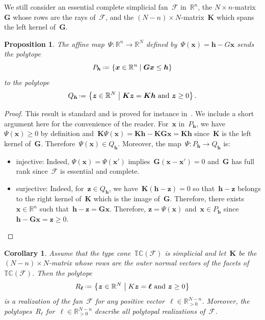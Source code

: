 \documentclass{amsart}
\newtheorem{corollary}[theorem]{Corollary}
\newtheorem{proposition}[theorem]{Proposition}
\theoremstyle{definition}
\newcommand{\R}{\mathbb{R}} %
\renewcommand{\b}[1]{{\boldsymbol{#1}}} %
\newcommand{\set}[2]{\left\{ #1 \;\middle|\; #2 \right\}} %
\newcommand{\eqdef}{\mbox{\,\raisebox{0.2ex}{\scriptsize\ensuremath{\mathrm:}}\ensuremath{=}\,}} %
\newcommand{\Fan}{\mathcal{F}} %
\newcommand{\typeCone}{\mathbb{TC}} %
\begin{document}
We still consider an essential complete simplicial fan~$\Fan$ in~$\R^n$, the $N \times n$-matrix~$\b{G}$ whose rows are the rays of~$\Fan$, and the $(N-n) \times N$-matrix~$\b{K}$ which spans the left kernel of~$\b{G}$.

\begin{proposition}
\label{prop:alternativePolytopalRealization}
The affine map~$\Psi: \R^n \to \R^N$ defined by~$\Psi(\b{x}) = \b{h} - G\b{x}$ sends the polytope
\[
P_\b{h} \eqdef \set{\b{x} \in \R^n}{\b{G}\b{x} \le \b{h}}
\]
to the polytope
\[
Q_\b{h} \eqdef \set{\b{z} \in \R^N}{\b{K}\b{z} = \b{K}\b{h} \text{ and } \b{z} \ge 0}.
\]
\end{proposition}

\begin{proof}
This result is standard and is proved for instance in~\cite[Coro.~9.5.7]{DeLoeraRambauSantos}.
We include a short argument here for the convenience of the reader.
For~$\b{x}$ in~$P_\b{h}$, we have $\Psi(\b{x}) \ge 0$ by definition and~$\b{K}\Psi(\b{x}) = \b{K}\b{h} - \b{K}\b{G}\b{x} = \b{K}\b{h}$ since~$\b{K}$ is the left kernel of~$\b{G}$. Therefore~$\Psi(\b{x}) \in Q_\b{h}$.
Moreover, the map~$\Psi : P_\b{h} \to Q_\b{h}$ is:
\begin{itemize}
\item injective: Indeed, $\Psi(\b{x}) = \Psi(\b{x}')$ implies~$\b{G}(\b{x} - \b{x}') = 0$ and~$\b{G}$ has full rank since~$\Fan$ is essential and complete.
\item surjective: Indeed, for~$\b{z} \in Q_\b{h}$, we have~$\b{K}(\b{h}-\b{z}) = 0$ so that~$\b{h}-\b{z}$ belongs to the right kernel of~$\b{K}$ which is the image of~$\b{G}$. Therefore, there exists~$\b{x} \in \R^n$ such that~$\b{h}-\b{z} = \b{G}\b{x}$. Therefore, $\b{z} = \Psi(\b{x})$ and~$\b{x} \in P_\b{h}$ since~$\b{h} - \b{G}\b{x} = \b{z} \ge 0$.\qedhere
\end{itemize}
\end{proof}

\begin{corollary}
\label{coro:simplicialTypeCone}
Assume that the type cone~$\typeCone(\Fan)$ is simplicial and let~$\b{K}$ be the $(N-n) \times N$-matrix whose rows are the outer normal vectors of the facets of~$\typeCone(\Fan)$. Then the polytope
\[
R_\b{\ell} \eqdef \set{\b{z} \in \R^N}{K\b{z} = \b{\ell} \text{ and } \b{z} \ge 0}
\]
is a realization of the fan~$\Fan$ for any positive vector~$\b{\ell} \in \R_{>0}^{N-n}$.
Moreover, the polytopes~$R_\b{\ell}$ for~$\b{\ell} \in \R_{>0}^{N-n}$ describe all polytopal realizations of~$\Fan$.
\end{corollary}
\end{document}
